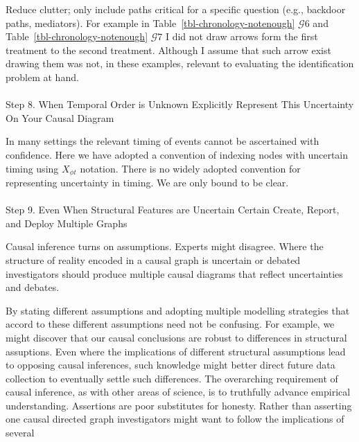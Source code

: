 \documentclass[
  single column]{article}
\makeatletter
\let\oldparagraph\paragraph
\renewcommand{\paragraph}{
    \@ifstar
      \xxxParagraphStar
      \xxxParagraphNoStar
  }
\newcommand{\xxxParagraphStar}[1]{\oldparagraph*{#1}\mbox{}}
\newcommand{\xxxParagraphNoStar}[1]{\oldparagraph{#1}\mbox{}}
\makeatother
\begin{document}
Reduce clutter; only include paths critical for a specific question
(e.g., backdoor paths, mediators). For example in
Table~\ref{tbl-chronology-notenough} \(\mathcal{G} 6\) and
Table~\ref{tbl-chronology-notenough} \(\mathcal{G} 7\) I did not draw
arrows form the first treatment to the second treatment. Although I
assume that such arrow exist drawing them was not, in these examples,
relevant to evaluating the identification problem at hand.

\paragraph{Step 8. When Temporal Order is Unknown Explicitly Represent
This Uncertainty On Your Causal
Diagram}\label{step-8.-when-temporal-order-is-unknown-explicitly-represent-this-uncertainty-on-your-causal-diagram}

In many settings the relevant timing of events cannot be ascertained
with confidence. Here we have adopted a convention of indexing nodes
with uncertain timing using \(X_{\phi t}\) notation. There is no widely
adopted convention for representing uncertainty in timing. We are only
bound to be clear.

\paragraph{Step 9. Even When Structural Features are Uncertain Certain
Create, Report, and Deploy Multiple
Graphs}\label{step-9.-even-when-structural-features-are-uncertain-certain-create-report-and-deploy-multiple-graphs}

Causal inference turns on assumptions. Experts might disagree. Where the
structure of reality encoded in a causal graph is uncertain or debated
investigators should produce multiple causal diagrams that reflect
uncertainties and debates.

By stating different assumptions and adopting multiple modelling
strategies that accord to these different assumptions need not be
confusing. For example, we might discover that our causal conclusions
are robust to differences in structural assuptions. Even where the
implications of different structural assumptions lead to opposing causal
inferences, such knowledge might better direct future data collection to
eventually settle such differences. The overarching requirement of
causal inference, as with other areas of science, is to truthfully
advance empirical understanding. Assertions are poor substitutes for
honesty. Rather than asserting one causal directed graph investigators
might want to follow the implications of several
\end{document}
